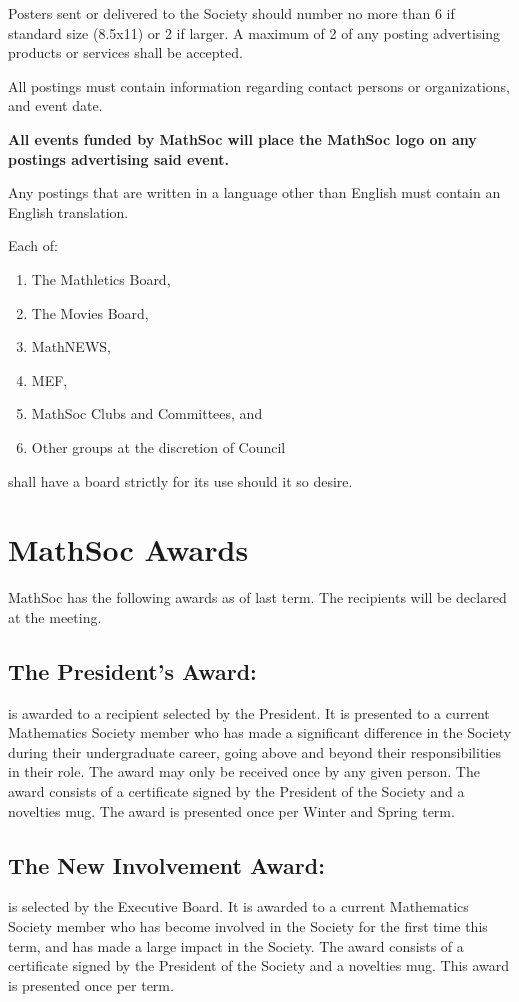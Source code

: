 \documentclass[12pt, letterpaper]{article}
\begin{document}
Posters sent or delivered to the Society should number no more than 6 if standard size (8.5x11) or 2 if larger. A maximum of 2 of any posting advertising products or services shall be accepted.

All postings must contain information regarding contact persons or organizations, and event date.

\textbf{All events funded by MathSoc will place the MathSoc logo on any postings advertising said event.}

Any postings that are written in a language other than English must contain an English translation.

Each of:
\begin{enumerate}
	\item The Mathletics Board,
	\item The Movies Board,
	\item MathNEWS,
	\item MEF,
	\item MathSoc Clubs and Committees, and
	\item Other groups at the discretion of Council
\end{enumerate}
shall have a board strictly for its use should it so desire.

\newpage
{}
\section*{MathSoc Awards}
MathSoc has the following awards as of last term. The recipients will be declared at the meeting.

\subsection*{The President's Award:} 
is awarded to a recipient selected by the President. It is presented to a current Mathematics Society member who has made a significant difference in the Society during their undergraduate career, going above and beyond their responsibilities in their role. The award may only be received once by any given person. The award consists of a certificate signed by the President of the Society and a novelties mug. The award is presented once per Winter and Spring term.


\subsection*{The New Involvement Award:} 
is selected by the Executive Board. It is awarded to a current Mathematics Society member who has become involved in the Society for the first time this term, and has made a large impact in the Society. The award consists of a certificate signed by the President of the Society and a novelties mug. This award is presented once per term.
\end{document}
